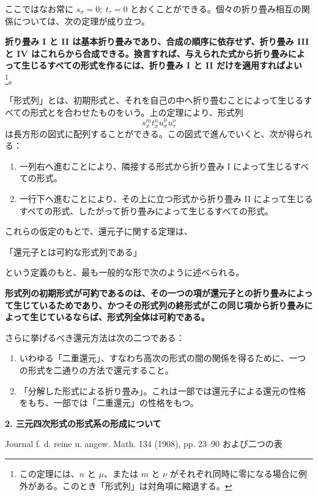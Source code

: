 \documentclass[11pt]{jlreq}
\begin{document}
ここではなお常に \(s_\sigma=0;\ t_\tau=0\) とおくことができる。個々の折り畳み相互の関係については、次の定理が成り立つ。

\textbf{折り畳み I と II は基本折り畳みであり、合成の順序に依存せず、折り畳み III と IV はこれらから合成できる。換言すれば、与えられた式から折り畳みによって生じるすべての形式を作るには、折り畳み I と II だけを適用すればよい}\footnote{この定理には、\(n\) と \(\mu\)、または \(m\) と \(\nu\) がそれぞれ同時に零になる場合に例外がある。このとき「形式列」は対角項に縮退する。}。

「形式列」とは、初期形式と、それを自己の中へ折り畳むことによって生じるすべての形式とを合わせたものをいう。上の定理により、形式列
\[
s_x^m t_x^n u_\sigma^\mu u_\tau^\nu
\]
は長方形の図式に配列することができる。この図式で進んでいくと、次が得られる：
\begin{enumerate}
\item 一列右へ進むことにより、隣接する形式から折り畳み I によって生じるすべての形式。
\item 一行下へ進むことにより、その上に立つ形式から折り畳み II によって生じるすべての形式、したがって折り畳みによって生じるすべての形式。
\end{enumerate}

これらの仮定のもとで、還元子に関する定理は、
\begin{center}
「還元子とは可約な形式列である」
\end{center}
という定義のもと、最も一般的な形で次のように述べられる。

\begin{center}
\textbf{形式列の初期形式が可約であるのは、その一つの項が還元子との折り畳みによって生じているためであり、かつその形式列の終形式がこの同じ項から折り畳みによって生じているならば、形式列全体は可約である。}
\end{center}

さらに挙げるべき還元方法は次の二つである：
\begin{enumerate}
\item いわゆる「二重還元」、すなわち高次の形式の間の関係を得るために、一つの形式を二通りの方法で還元すること。
\item 「分解した形式による折り畳み」。これは一部では還元子による還元の性格をもち、一部では「二重還元」の性格をもつ。
\end{enumerate}

\clearpage

\begin{center}
{\Large\bfseries 2. 三元四次形式の形式系の形成について}\par
\vspace{1.5em}
Journal f. d. reine u. angew. Math. 134 (1908), pp. 23--90 および二つの表
\end{center}
\end{document}
